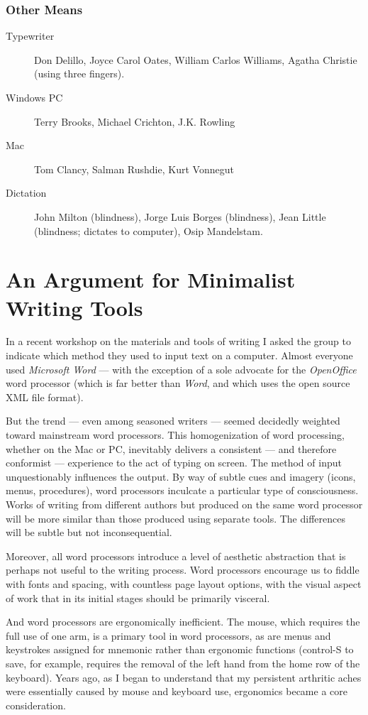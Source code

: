 \documentclass[letterpaper,oneside]{memoir}
\begin{document}
\subsubsection{Other Means}
  \begin{description}
  \item [Typewriter] Don Delillo, Joyce Carol Oates, William Carlos Williams, Agatha Christie (using three fingers).
\item [Windows PC] Terry Brooks, Michael Crichton, J.K. Rowling
\item [Mac] Tom Clancy, Salman Rushdie, Kurt Vonnegut
\item [Dictation] John Milton (blindness), Jorge Luis Borges (blindness), Jean Little (blindness; dictates to computer), Osip Mandelstam.
  \end{description}
\newpage
\section{An Argument for Minimalist Writing Tools}
In a recent workshop on the materials and tools of writing I asked the group to indicate which method they used to input text on a computer. Almost everyone used \textit{Microsoft Word} --- with the exception of a sole advocate for the \textit{OpenOffice} word processor (which is far better than \textit{Word}, and which uses the open source \textsc{XML} file format).

But the trend --- even among seasoned writers --- seemed decidedly weighted toward mainstream word processors. This homogenization of word processing, whether on the Mac or PC, inevitably delivers a consistent --- and therefore conformist --- experience to the act of typing on screen. The method of input unquestionably influences the output. By way of subtle cues and imagery (icons, menus, procedures), word processors inculcate a particular type of consciousness. Works of writing from different authors but produced on the same word processor will be more similar than those produced using separate tools. The differences will be subtle but not inconsequential.

Moreover, all word processors introduce a level of aesthetic abstraction that is perhaps not useful to the writing process. Word processors encourage us to fiddle with fonts and spacing, with countless page layout options, with the visual aspect of work that in its initial stages should be primarily visceral.

And word processors are ergonomically inefficient. The mouse, which requires the full use of one arm, is a primary tool in word processors, as are menus and keystrokes assigned for mnemonic rather than ergonomic functions (control-S to save, for example, requires the removal of the left hand from the home row of the keyboard). Years ago, as I began to understand that my persistent arthritic aches were essentially caused by mouse and keyboard use, ergonomics became a core consideration.
\end{document}
